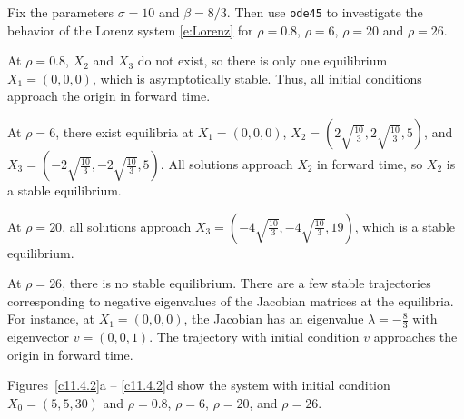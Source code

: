 \documentclass{ximera}
\begin{document}
\begin{computerExercise} \label{c11.4.2}
Fix the parameters $\sigma=10$ and $\beta = 8/3$.  Then
use {\tt ode45} to investigate the behavior of the Lorenz system
\eqref{e:Lorenz} for $\rho=0.8$, $\rho=6$, $\rho=20$ and $\rho=26$.

\begin{solution}

At $\rho = 0.8$, $X_2$ and $X_3$ do not exist, so there is only one
equilibrium $X_1 = (0,0,0)$, which is asymptotically stable.  Thus, all
initial conditions approach the origin in forward time.

\para At $\rho = 6$, there exist equilibria at $X_1 = (0,0,0)$, $X_2 =
(2\sqrt{\frac{10}{3}}, 2\sqrt{\frac{10}{3}}, 5)$, and
$X_3 = (-2\sqrt{\frac{10}{3}}, -2\sqrt{\frac{10}{3}}, 5)$.  All solutions
approach $X_2$ in forward time, so $X_2$ is a stable equilibrium.

\para At $\rho = 20$, all solutions approach $X_3 = (-4\sqrt{\frac{10}{3}},
-4\sqrt{\frac{10}{3}}, 19)$, which is a stable equilibrium.

\para At $\rho = 26$, there is no stable equilibrium.  There are a few
stable trajectories corresponding to negative eigenvalues of the Jacobian
matrices at the equilibria.  For instance, at $X_1 = (0,0,0)$, the Jacobian
has an eigenvalue $\lambda = -\frac{8}{3}$ with eigenvector $v = (0,0,1)$.
The trajectory with initial condition $v$ approaches the origin in forward
time.

\para Figures~\ref{c11.4.2}a -- \ref{c11.4.2}d show the system with
initial condition $X_0 = (5,5,30)$ and $\rho = 0.8$, $\rho = 6$, $\rho = 20$,
and $\rho = 26$.


\end{solution}
\end{computerExercise}
\end{document}
